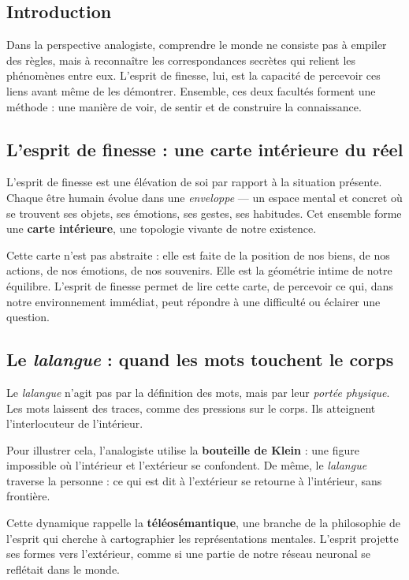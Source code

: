 \documentclass[12pt,oneside]{article}
\begin{document}
\subsection{Introduction}

Dans la perspective analogiste, comprendre le monde ne consiste pas à empiler des règles, mais à reconnaître les correspondances secrètes qui relient les phénomènes entre eux. L'esprit de finesse, lui, est la capacité de percevoir ces liens avant même de les démontrer. Ensemble, ces deux facultés forment une méthode : une manière de voir, de sentir et de construire la connaissance.

\subsection{L'esprit de finesse : une carte intérieure du réel}

L'esprit de finesse est une élévation de soi par rapport à la situation présente. Chaque être humain évolue dans une \emph{enveloppe} --- un espace mental et concret où se trouvent ses objets, ses émotions, ses gestes, ses habitudes. Cet ensemble forme une \textbf{carte intérieure}, une topologie vivante de notre existence.

Cette carte n'est pas abstraite : elle est faite de la position de nos biens, de nos actions, de nos émotions, de nos souvenirs. Elle est la géométrie intime de notre équilibre. L'esprit de finesse permet de lire cette carte, de percevoir ce qui, dans notre environnement immédiat, peut répondre à une difficulté ou éclairer une question.

\subsection{Le \textit{lalangue} : quand les mots touchent le corps}

Le \textit{lalangue} n'agit pas par la définition des mots, mais par leur \emph{portée physique}.  
Les mots laissent des traces, comme des pressions sur le corps. Ils atteignent l'interlocuteur de l'intérieur.

Pour illustrer cela, l'analogiste utilise la \textbf{bouteille de Klein} : une figure impossible où l'intérieur et l'extérieur se confondent.  
De même, le \textit{lalangue} traverse la personne : ce qui est dit à l'extérieur se retourne à l'intérieur, sans frontière.

Cette dynamique rappelle la \textbf{téléosémantique}, une branche de la philosophie de l'esprit qui cherche à cartographier les représentations mentales. L'esprit projette ses formes vers l'extérieur, comme si une partie de notre réseau neuronal se reflétait dans le monde.
\end{document}
